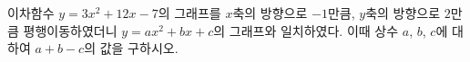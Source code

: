 \hspace*{2mm}\begin{minipage}[t]{\dimexpr\linewidth-2mm\relax}\vspace{0pt}
이차함수 $y=3x^2+12x-7$의 그래프를 $x$축의 방향으로 $-1$만큼, $y$축의 방향으로 $2$만큼 평행이동하였더니 $y=ax^2+bx+c$의 그래프와 일치하였다. 이때 상수 $a$, $b$, $c$에 대하여 $a+b-c$의 값을 구하시오.\end{minipage}
